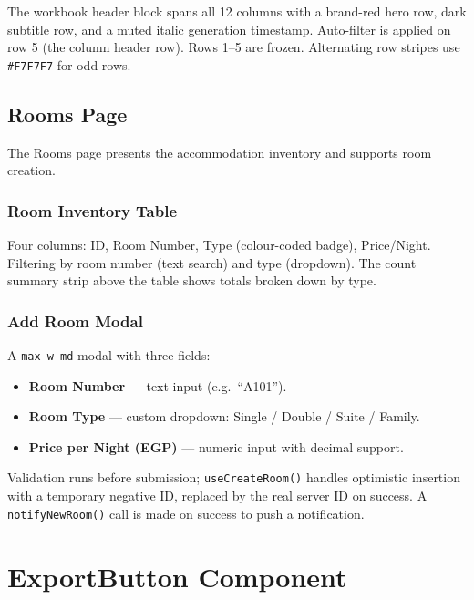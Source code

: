 \documentclass[12pt,a4paper]{report}
\begin{document}
The workbook header block spans all 12 columns with a brand-red hero row,
dark subtitle row, and a muted italic generation timestamp. Auto-filter is
applied on row 5 (the column header row). Rows 1–5 are frozen.
Alternating row stripes use \texttt{\#F7F7F7} for odd rows.

\section{Rooms Page}

The Rooms page presents the accommodation inventory and supports room creation.

\subsection{Room Inventory Table}

Four columns: ID, Room Number, Type (colour-coded badge), Price/Night. Filtering
by room number (text search) and type (dropdown). The count summary strip above
the table shows totals broken down by type.

\subsection{Add Room Modal}

A \texttt{max-w-md} modal with three fields:

\begin{itemize}[leftmargin=2em]
  \item \textbf{Room Number} — text input (e.g.\ ``A101'').
  \item \textbf{Room Type} — custom dropdown: Single / Double / Suite / Family.
  \item \textbf{Price per Night (EGP)} — numeric input with decimal support.
\end{itemize}

Validation runs before submission; \texttt{useCreateRoom()} handles optimistic
insertion with a temporary negative ID, replaced by the real server ID on
success. A \texttt{notifyNewRoom()} call is made on success to push a
notification.

\chapter{ExportButton Component}
\end{document}

